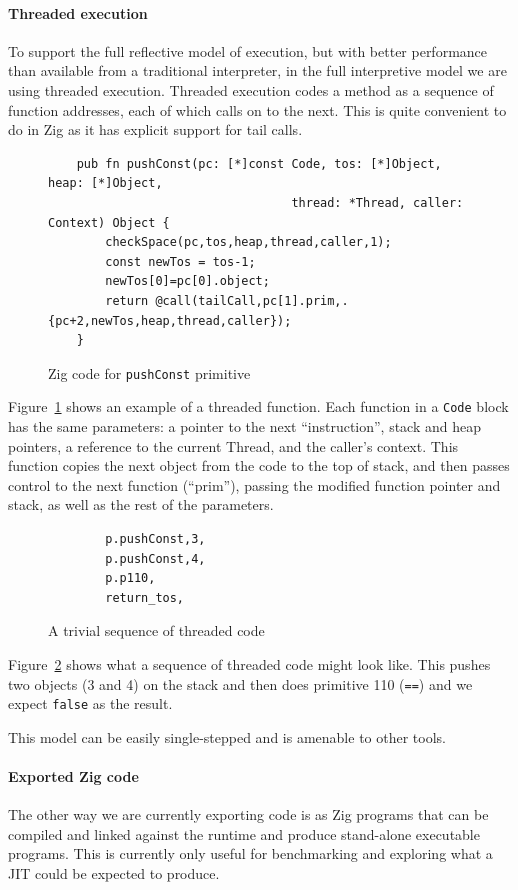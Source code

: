 \documentclass[
]{ceurart}
\def\Figref{Figure~\ref}
\begin{document}
\paragraph{Threaded execution}
To support the full reflective model of execution, but with better performance than available from a traditional interpreter, in the full interpretive model we are using threaded execution.
Threaded execution codes a method as a sequence of function addresses, each of which calls on to the next.
This is quite convenient to do in Zig\cite{zig-lang} as it has explicit support for tail calls.
\begin{figure}[htbp]\label{pushConst}
  \caption{Zig code for {\tt pushConst} primitive}
\begin{verbatim}
    pub fn pushConst(pc: [*]const Code, tos: [*]Object, heap: [*]Object,
                                  thread: *Thread, caller: Context) Object {
        checkSpace(pc,tos,heap,thread,caller,1);
        const newTos = tos-1;
        newTos[0]=pc[0].object;
        return @call(tailCall,pc[1].prim,.{pc+2,newTos,heap,thread,caller});
    }
\end{verbatim}
\end{figure}
\Figref{pushConst} shows an example of a threaded function.
Each function in a \verb_Code_ block has the same parameters: a pointer to the next ``instruction'', stack and heap pointers, a reference to the current Thread, and the caller's context.
This function copies the next object from the code to the top of stack, and then passes control to the next function (``prim''), passing the modified function pointer and stack, as well as the rest of the parameters.
\begin{figure}[htbp]\label{trivial-code}
  \caption{A trivial sequence of threaded code}
\begin{verbatim}
        p.pushConst,3,
        p.pushConst,4,            
        p.p110,
        return_tos,
\end{verbatim}
\end{figure}
\Figref{trivial-code} shows what a sequence of threaded code might look like.
This pushes two objects (3 and 4) on the stack and then does primitive 110 (\verb_==_) and we expect \verb_false_ as the result.

This model can be easily single-stepped and is amenable to other tools.
\paragraph{Exported Zig code}
The other way we are currently exporting code is as Zig programs that can be compiled and linked against the runtime and produce stand-alone executable programs.
This is currently only useful for benchmarking and exploring what a JIT could be expected to produce.
\end{document}
